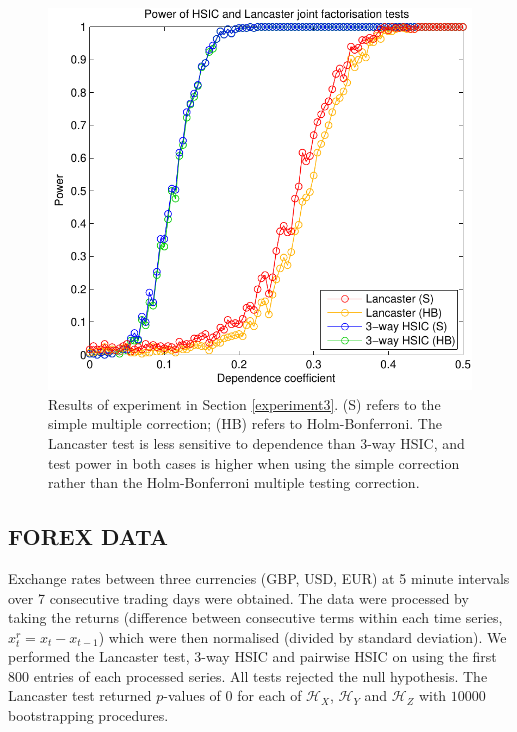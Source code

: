 \documentclass[]{article}
\begin{document}
\begin{figure}[ht]
\vskip 0.2in
\begin{center}
\centerline{\includegraphics[scale=0.6]{UAI_Figure3.pdf}}
\caption{Results of experiment in Section \ref{experiment3}. (S) refers to the simple multiple correction; (HB) refers to Holm-Bonferroni. The Lancaster test is less sensitive to dependence than 3-way HSIC, and test power in both cases is higher when using the simple correction rather than the Holm-Bonferroni multiple testing correction.}
\label{strong-pairwise}
\end{center}
\vskip -0.2in
\end{figure} 

\subsection{FOREX DATA}

Exchange rates between three currencies (GBP, USD, EUR) at 5 minute intervals over 7 consecutive trading days were obtained. The data were processed by taking the returns (difference between consecutive terms within each time series, $x_t^r = x_t-x_{t-1}$) which were then normalised (divided by standard deviation). We performed the Lancaster test, 3-way HSIC and pairwise HSIC on using the first $800$ entries of each processed series. All tests rejected the null hypothesis. The Lancaster test returned $p$-values of 0 for each of $\mathcal{H}_X$, $\mathcal{H}_Y$ and $\mathcal{H}_Z$ with $10000$ bootstrapping procedures.
\end{document}
